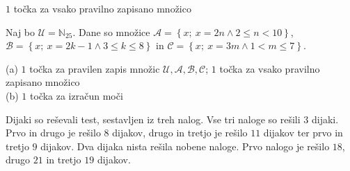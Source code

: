 \documentclass[addpoints,12pt]{exam}
\begin{document}
\begin{questions}
    \begin{solution}[1cm]
        $1$ točka za vsako pravilno zapisano množico
    \end{solution}




    \newpage

    \question
    Naj bo $\mathcal{U}=\mathbb{N}_{25}$. Dane so množice $\mathcal{A}=\left\{x;\ x=2n \land 2\leq n<10\right\}$, $\mathcal{B}=\left\{x;\ x=2k-1 \land 3\leq k\leq 8\right\}$ in $\mathcal{C}=\left\{x;\ x=3m \land 1<m\leq 7\right\}$. 

    \begin{solution}[8cm]
        (a) $1$ točka za pravilen zapis množic $\mathcal{U}, \mathcal{A}, \mathcal{B}, \mathcal{C}$; $1$ točka za vsako pravilno zapisano množico \\
        (b) $1$ točka za izračun moči
            \end{solution}


            \newpage
    \question[5]
    Dijaki so reševali test, sestavljen iz treh nalog. Vse tri naloge so rešili $3$ dijaki. 
    Prvo in drugo je rešilo $8$ dijakov, drugo in tretjo je rešilo $11$ dijakov ter prvo in tretjo $9$ dijakov.
    Dva dijaka nista rešila nobene naloge. Prvo nalogo je rešilo $18$, drugo $21$ in tretjo $19$ dijakov.


\end{questions}
\end{document}
